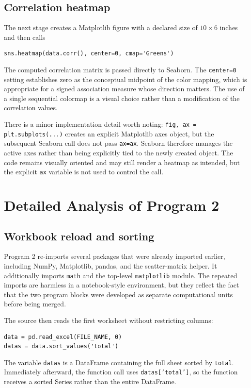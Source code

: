 \documentclass[11pt,a4paper]{article}
\begin{document}
\subsection{Correlation heatmap}
The next stage creates a Matplotlib figure with a declared size of $10\times6$ inches and then calls
\begin{lstlisting}
sns.heatmap(data.corr(), center=0, cmap='Greens')
\end{lstlisting}
The computed correlation matrix is passed directly to Seaborn. The \texttt{center=0} setting establishes zero as the conceptual midpoint of the color mapping, which is appropriate for a signed association measure whose direction matters. The use of a single sequential colormap is a visual choice rather than a modification of the correlation values.

There is a minor implementation detail worth noting: \texttt{fig, ax = plt.subplots(...)} creates an explicit Matplotlib axes object, but the subsequent Seaborn call does not pass \texttt{ax=ax}. Seaborn therefore manages the active axes rather than being explicitly tied to the newly created object. The code remains visually oriented and may still render a heatmap as intended, but the explicit \texttt{ax} variable is not used to control the call.

\section{Detailed Analysis of Program 2}
\subsection{Workbook reload and sorting}
Program 2 re-imports several packages that were already imported earlier, including NumPy, Matplotlib, pandas, and the scatter-matrix helper. It additionally imports \texttt{math} and the top-level \texttt{matplotlib} module. The repeated imports are harmless in a notebook-style environment, but they reflect the fact that the two program blocks were developed as separate computational units before being merged.

The source then reads the first worksheet without restricting columns:
\begin{lstlisting}
data = pd.read_excel(FILE_NAME, 0)
datas = data.sort_values('total')
\end{lstlisting}
The variable \texttt{datas} is a DataFrame containing the full sheet sorted by \texttt{total}. Immediately afterward, the function call uses \texttt{datas['total']}, so the function receives a sorted Series rather than the entire DataFrame.
\end{document}
